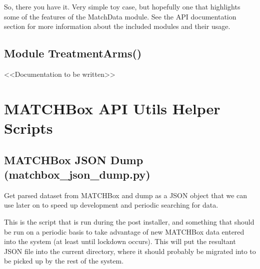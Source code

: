 \documentclass[letterpaper,10pt,english]{sphinxmanual}
\begin{document}
So, there you have it.  Very simple toy case, but hopefully one that highlights
some of the features of the MatchData module.  See the API documentation section
for more information about the included modules and their usage.


\section{Module TreatmentArms()}
\label{\detokenize{tutorial:module-treatmentarms}}
\textless{}\textless{}Documentation to be written\textgreater{}\textgreater{}


\chapter{MATCHBox API Utils Helper Scripts}
\label{\detokenize{helper_scripts:matchbox-api-utils-helper-scripts}}\label{\detokenize{helper_scripts::doc}}

\section{MATCHBox JSON Dump (matchbox\_json\_dump.py)}
\label{\detokenize{helper_scripts:matchbox-json-dump-matchbox-json-dump-py}}
Get parsed dataset from MATCHBox and dump as a JSON object that we can use
later on to speed up development and periodic searching for data.

This is the script that is run during the post installer, and something that
should be run on a periodic basis to take advantage of new MATCHBox data entered
into the system (at least until lockdown occurs).  This will put the resultant
JSON file into the current directory, where it should probably be migrated into
 to be picked up by the rest of the system.
\end{document}
